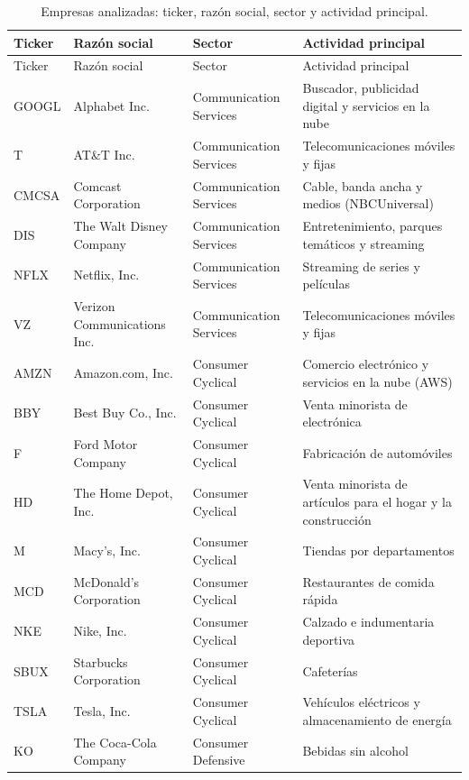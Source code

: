 \documentclass[12pt,letterpaper,oneside]{report}
\renewcommand{\_}{\UnderscoreOriginal\allowbreak}
\begin{document}
{\small
\begin{longtable}{@{}l>{\raggedright}p{4.1cm}>{\raggedright}p{3.1cm}>{\raggedright\arraybackslash}p{5.3cm}@{}}
\caption{Empresas analizadas: ticker, razón social, sector y actividad principal.}\label{tab:empresas}\\
\toprule
Ticker & Razón social & Sector & Actividad principal \\
\midrule
\endfirsthead
\toprule
Ticker & Razón social & Sector & Actividad principal \\
\midrule
\endhead
\bottomrule
\endfoot
GOOGL & Alphabet Inc. & Communication Services & Buscador, publicidad digital y servicios en la nube \\
T & AT\&T Inc. & Communication Services & Telecomunicaciones móviles y fijas \\
CMCSA & Comcast Corporation & Communication Services & Cable, banda ancha y medios (NBCUniversal) \\
DIS & The Walt Disney Company & Communication Services & Entretenimiento, parques temáticos y streaming \\
NFLX & Netflix, Inc. & Communication Services & Streaming de series y películas \\
VZ & Verizon Communications Inc. & Communication Services & Telecomunicaciones móviles y fijas \\
AMZN & Amazon.com, Inc. & Consumer Cyclical & Comercio electrónico y servicios en la nube (AWS) \\
BBY & Best Buy Co., Inc. & Consumer Cyclical & Venta minorista de electrónica \\
F & Ford Motor Company & Consumer Cyclical & Fabricación de automóviles \\
HD & The Home Depot, Inc. & Consumer Cyclical & Venta minorista de artículos para el hogar y la construcción \\
M & Macy's, Inc. & Consumer Cyclical & Tiendas por departamentos \\
MCD & McDonald's Corporation & Consumer Cyclical & Restaurantes de comida rápida \\
NKE & Nike, Inc. & Consumer Cyclical & Calzado e indumentaria deportiva \\
SBUX & Starbucks Corporation & Consumer Cyclical & Cafeterías \\
TSLA & Tesla, Inc. & Consumer Cyclical & Vehículos eléctricos y almacenamiento de energía \\
KO & The Coca-Cola Company & Consumer Defensive & Bebidas sin alcohol \\

\end{longtable}}
\end{document}
